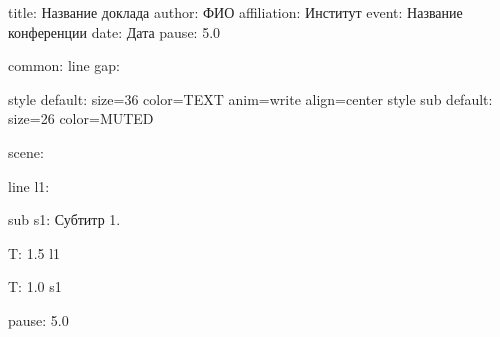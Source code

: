\documentclass[a4paper,11pt]{article}
\begin{document}
%
title: {Название доклада}
author: {ФИО}
affiliation: {Институт}
event: {Название конференции}
date: {Дата}
pause: 5.0


%
common:
line gap: {\vspace{1.0cm}}

style default: size=36 color=TEXT anim=write align=center
style sub default: size=26 color=MUTED


%
%
%
%
%
%


scene: {}

line l1: {}

sub s1: {Субтитр 1.}

T: 1.5 l1

T: 1.0 s1

pause: 5.0
\end{document}
